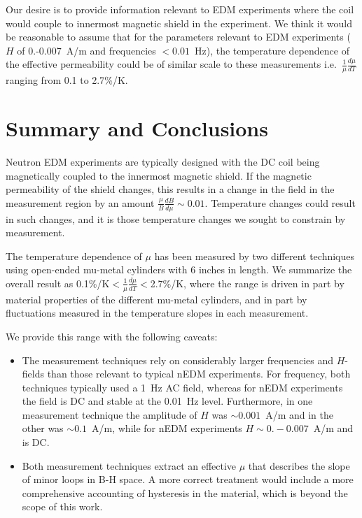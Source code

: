 \documentclass[review]{elsarticle}
\begin{document}
Our desire is to provide information relevant to EDM experiments where
the coil would couple to innermost magnetic shield in the experiment.
We think it would be reasonable to assume that for the parameters
relevant to EDM experiments ($H$ of 0.-0.007~A/m and frequencies
$<0.01$~Hz), the temperature dependence of the effective permeability
could be of similar scale to these measurements
i.e.~$\frac{1}{\mu}\frac{d\mu}{dT}$ ranging from 0.1 to 2.7\%/K.

\section{Summary and Conclusions}


Neutron EDM experiments are typically designed with the DC coil being
magnetically coupled to the innermost magnetic shield.  If the
magnetic permeability of the shield changes, this results in a change
in the field in the measurement region by an amount
$\frac{\mu}{B}\frac{dB}{d\mu}\sim 0.01$.  Temperature changes could
result in such changes, and it is those temperature changes we sought
to constrain by measurement.

The temperature dependence of $\mu$ has been measured by two different
techniques using open-ended mu-metal cylinders with 6 inches in
length.  We summarize the overall result as
0.1\%/K$<\frac{1}{\mu}\frac{d\mu}{dT}<$2.7\%/K, where the range is
driven in part by material properties of the different mu-metal
cylinders, and in part by fluctuations measured in the temperature
slopes in each measurement.

We provide this range with the following caveats:
\begin{itemize}
\item The measurement techniques rely on considerably larger
  frequencies and $H$-fields than those relevant to typical nEDM
  experiments.  For frequency, both techniques typically used a 1~Hz
  AC field, whereas for nEDM experiments the field is DC and stable at
  the 0.01~Hz level.  Furthermore, in one measurement technique the
  amplitude of $H$ was $\sim 0.001$~A/m and in the other was $\sim 0.1$~A/m,
  while for nEDM experiments $H\sim 0.-0.007$~A/m and is DC.
\item Both measurement techniques extract an effective $\mu$ that
  describes the slope of minor loops in B-H space.  A more correct
  treatment would include a more comprehensive accounting of
  hysteresis in the material, which is beyond the scope of this work.
\end{itemize}
\end{document}
